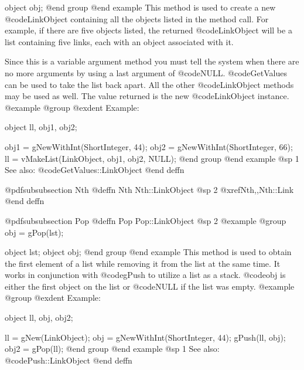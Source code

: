 object  obj;
@end group
@end example
This method is used to create a new @code{LinkObject} containing all the
objects listed in the method call.  For example, if there are five objects listed, the
returned @code{LinkObject} will be a list containing five links, each with
an object associated with it.

Since this is a variable argument method you must tell the system when there are no
more arguments by using a last argument of @code{NULL}.  @code{GetValues} can be used to
take the list back apart.  All the other @code{LinkObject} methods may be
used as well.  The value returned is the new
@code{LinkObject} instance.
@example
@group
@exdent Example:

object  ll, obj1, obj2;

obj1 = gNewWithInt(ShortInteger, 44);
obj2 = gNewWithInt(ShortInteger, 66);
ll = vMakeList(LinkObject, obj1, obj2, NULL);
@end group
@end example
@sp 1
See also:  @code{GetValues::LinkObject}
@end deffn









@pdfsubsubsection {Nth}
@deffn {Nth} Nth::LinkObject
@sp 2
@xref{Nth,,Nth::Link}
@end deffn
















@pdfsubsubsection {Pop}
@deffn {Pop} Pop::LinkObject
@sp 2
@example
@group
obj = gPop(lst);

object  lst;
object  obj;
@end group
@end example
This method is used to obtain the first element of a list while
removing it from the list at the same time.  It works in conjunction
with @code{gPush} to utilize a list as a stack.  @code{obj} is either
the first object on the list or @code{NULL} if the list was empty.
@example
@group
@exdent Example:

object  ll, obj, obj2;

ll = gNew(LinkObject);
obj = gNewWithInt(ShortInteger, 44);
gPush(ll, obj);
obj2 = gPop(ll);
@end group
@end example
@sp 1
See also:  @code{Push::LinkObject}
@end deffn










